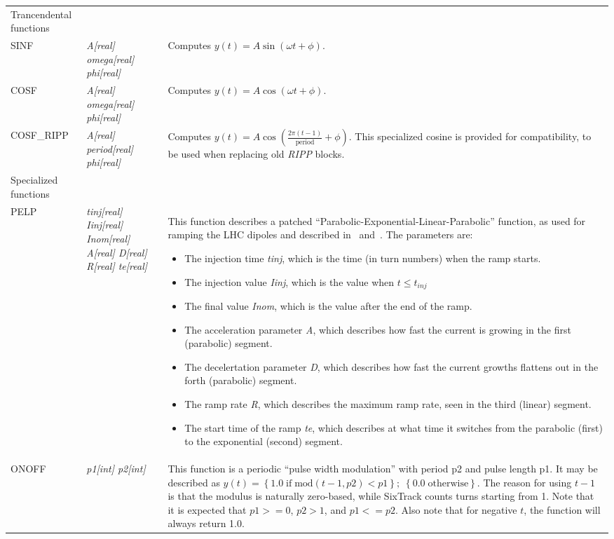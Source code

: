 \begin{center}
\begin{longtable}{|p{2.25cm} | p{4cm} p{9.5cm}|}
  \hline
  \rowcolor{blue!15}
  Trancendental functions & & \\*

  SINF        & \emph{A[real] omega[real] phi[real]} & 
  Computes $y(t) = A\sin\left(\omega t + \phi\right)$.\\*

  COSF        & \emph{A[real] omega[real] phi[real]} & 
  Computes $y(t) = A\cos\left(\omega t + \phi\right)$.\\*
  COSF\_RIPP  & \emph{A[real] period[real] phi[real]} & 
  Computes $y(t) = A\cos\left(\frac{2\pi (t-1)}{\mathrm{period}} + \phi\right)$. 
  This specialized cosine is provided for compatibility, to be used when replacing old \emph{RIPP} blocks.\\*

  \hline
  \rowcolor{blue!15}
  Specialized functions & & \\*

  PELP        & \emph{tinj[real] Iinj[real] Inom[real] A[real] D[real] R[real] te[real]} & 
  This function describes a patched ``Parabolic-Exponential-Linear-Parabolic'' function, as used for ramping the LHC dipoles and described in~\cite[Appendix C]{SRussen:fieldComp} and~\cite{BurlaKing:CurrentRamp}. 
  The parameters are:
  \begin{itemize}
  \setlength\itemsep{-0.3em}
  \item The injection time \emph{tinj}, which is the time (in turn numbers) when the ramp starts.
  \item The injection value \emph{Iinj}, which is the value when $t\le t_{inj}$
  \item The final value \emph{Inom}, which is the value after the end of the ramp.
  \item The acceleration parameter \emph{A}, which describes how fast the current is growing in the first (parabolic) segment.
  \item The decelertation parameter \emph{D}, which describes how fast the current growths flattens out in the forth (parabolic) segment.
  \item The ramp rate \emph{R}, which describes the maximum ramp rate, seen in the third (linear) segment.
  \item The start time of the ramp \emph{te}, which describes at what time it switches from the parabolic (first) to the exponential (second) segment.
  \end{itemize}
  \\*
  ONOFF       & \emph{p1[int] p2[int]} &
  This function is a periodic ``pulse width modulation'' with period p2 and pulse length p1.
  It may be described as
  $y(t) =  \left\{1.0 \; \mathrm{if} \; \mathrm{mod}(t-1,p2) < p1 \right\}; \; \left\{ 0.0 \; \mathrm{otherwise} \right\}$.
  The reason for using $t-1$ is that the modulus is naturally zero-based, while SixTrack counts turns starting from 1.
  Note that it is expected that $p1 >= 0$, $p2 > 1$, and $p1 <= p2$.
  Also note that for negative $t$, the function will always return 1.0.
\end{longtable}
\end{center}

